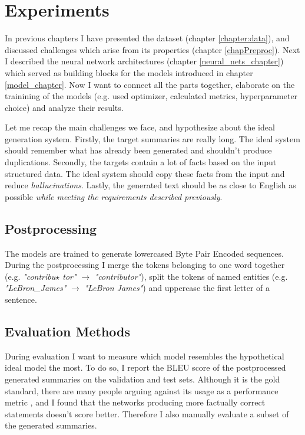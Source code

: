 \chapter{Experiments} \label{experiments_chapter}

In previous chapters I have presented the dataset (chapter \ref{chapter:data}), and discussed challenges which arise from its properties (chapter \ref{chapPreproc}). Next I described the neural network architectures (chapter \ref{neural_nets_chapter}) which served as building blocks for the models introduced in chapter \ref{model_chapter}. Now I want to connect all the parts together, elaborate on the trainining of the models (e.g. used optimizer, calculated metrics, hyperparameter choice) and analyze their results.

Let me recap the main challenges we face, and hypothesize about the ideal generation system. Firstly, the target summaries are really long. The ideal system should remember what has already been generated and shouldn't produce duplications. Secondly, the targets contain a lot of facts based on the input structured data. The ideal system should copy these facts from the input and reduce \emph{hallucinations}. Lastly, the generated text should be as close to English as possible \emph{while meeting the requirements described previously}.

\section{Postprocessing}

The models are trained to generate lowercased Byte Pair Encoded sequences. During the postprocessing I merge the tokens belonging to one word together (e.g. \emph{"contribu$\star$ tor"} $\rightarrow$ \emph{"contributor"}), split the tokens of named entities (e.g. \emph{"LeBron\_James"} $\rightarrow$ \emph{"LeBron James"}) and uppercase the first letter of a sentence.

\section{Evaluation Methods}

During evaluation I want to measure which model resembles the hypothetical ideal model the most. To do so, I report the BLEU score \citep{papineni2002} of the postprocessed generated summaries on the validation and test sets. Although it is the gold standard, there are many people arguing against its usage as a performance metric \citep{celikyilmaz2021evaluation}, and I found that the networks producing more factually correct statements doesn't score better. Therefore I also manually evaluate a subset of the generated summaries.

